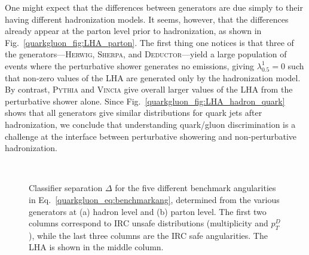 \documentclass[11pt]{cernrep}
\begin{document}
One might expect that the differences between generators are due simply to their having different hadronization models.  It seems, however, that the differences already appear at the parton level prior to hadronization, as shown in Fig.~\ref{quarkgluon_fig:LHA_parton}.  The first thing one notices is that three of the generators---\textsc{Herwig}, \textsc{Sherpa}, and  \textsc{Deductor}---yield a large population of events where the perturbative shower generates no emissions, giving $\lambda_{0.5}^1 = 0$ such that non-zero values of the LHA are generated only by the hadronization model.   By contrast, \textsc{Pythia} and \textsc{Vincia} give overall larger values of the LHA from the perturbative shower alone.  Since Fig.~\ref{quarkgluon_fig:LHA_hadron_quark} shows that all generators give similar distributions for quark jets after hadronization, we conclude that understanding quark/gluon discrimination is a challenge at the interface between perturbative showering and non-perturbative hadronization.

\begin{figure}
\centering
{}
$\qquad$
\caption{Classifier separation $\Delta$ for the five different benchmark angularities in Eq.~\eqref{quarkgluon_eq:benchmarkang}, determined from the various generators at (a) hadron level and (b) parton level.  The first two columns correspond to IRC unsafe distributions (multiplicity and $p_T^D$), while the last three columns are the IRC safe angularities.  The LHA is shown in the middle column.}
\label{quarkgluon_fig:summary_all}
\end{figure}
\end{document}

